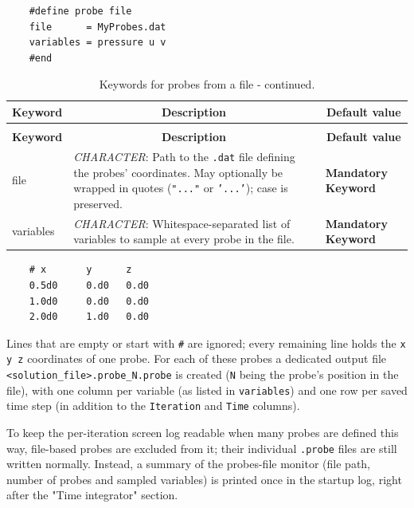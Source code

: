 \documentclass[a4paper,10pt]{report}
\begin{document}
\begin{lstlisting}
	#define probe file
	file      = MyProbes.dat
	variables = pressure u v
	#end
\end{lstlisting}

\begin{longtable}{|p{4cm}|p{10cm}|p{2.2cm}|}
	\caption{Keywords for probes from a file.} \label{tab:ProbesFileKey} \\
	\hline
	\multicolumn{1}{|c|}{\textbf{Keyword}} & \multicolumn{1}{c|}{\textbf{Description}} & \multicolumn{1}{c|}{\textbf{Default value}} \\ \hline
	\endfirsthead
	
	\caption{Keywords for probes from a file - continued.} \\
	\hline
	\multicolumn{1}{|c|}{\textbf{Keyword}} & \multicolumn{1}{c|}{\textbf{Description}} & \multicolumn{1}{c|}{\textbf{Default value}} \\ \hline
	\endhead
	
	file 	&
	\textit{CHARACTER}: Path to the \texttt{.dat} file defining the probes' coordinates. May optionally be wrapped in quotes (\texttt{"..."} or \texttt{'...'}); case is preserved. &
	\textbf{Mandatory Keyword} \\ \hline
	
	variables 	&
	\textit{CHARACTER}: Whitespace-separated list of variables to sample at every probe in the file. &
	\textbf{Mandatory Keyword} \\ \hline
\end{longtable}

\begin{lstlisting}
	# x       y      z
	0.5d0     0.d0   0.d0
	1.0d0     0.d0   0.d0
	2.0d0     1.d0   0.d0
\end{lstlisting}

Lines that are empty or start with \texttt{\#} are ignored; every remaining line holds the
\texttt{x y z} coordinates of one probe. For each of these probes a dedicated output file
\texttt{<solution\_file>.probe\_N.probe} is created (\texttt{N} being the probe's position in the
file), with one column per variable (as listed in \texttt{variables}) and one row per saved
time step (in addition to the \texttt{Iteration} and \texttt{Time} columns).

To keep the per-iteration screen log readable when many probes are defined this way,
file-based probes are excluded from it; their individual \texttt{.probe} files are still
written normally. Instead, a summary of the probes-file monitor (file path, number of
probes and sampled variables) is printed once in the startup log, right after the
"Time integrator" section.
\end{document}
